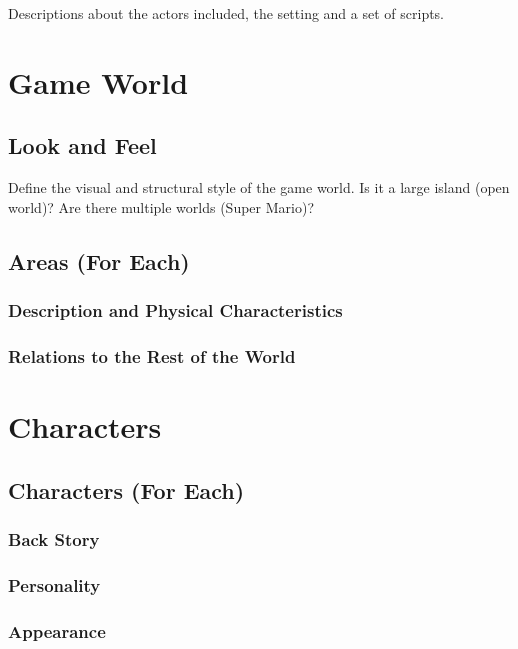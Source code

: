 \documentclass[12pt]{article}
\begin{document}
Descriptions about the actors included, the setting and a set of scripts.

\section{Game World}

\subsection{Look and Feel}

Define the visual and structural style of the game world. Is it a large island (open world)? Are there multiple worlds (Super Mario)?

\subsection{Areas (For Each)}

\subsubsection{Description and Physical Characteristics}

\subsubsection{Relations to the Rest of the World}

\section{Characters}

\subsection{Characters (For Each)}

\subsubsection{Back Story}

\subsubsection{Personality}

\subsubsection{Appearance}
\end{document}
